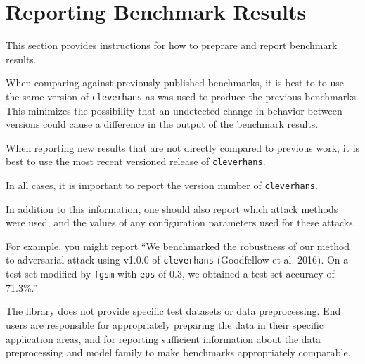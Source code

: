 \section{Reporting Benchmark Results}
\label{sec:benchmark}

This section provides instructions for how to preprare and report benchmark
results.

When comparing against previously published benchmarks, it is best to to use the
same version of \texttt{cleverhans} as was used to produce the previous
benchmarks. This minimizes the possibility that an undetected change in behavior
between versions could cause a difference in the output of the benchmark
results.

When reporting new results that are not directly compared to previous work, it
is best to use the most recent versioned release of \texttt{cleverhans}.

In all cases, it is important to report the version number of
\texttt{cleverhans}.

In addition to this information, one should also report which attack methods
were used, and the values of any configuration parameters used for these
attacks.

For example, you might report ``We benchmarked the robustness of our method to
adversarial attack using v1.0.0 of \texttt{cleverhans} (Goodfellow et al. 2016).
On a test set modified by \texttt{fgsm} with \texttt{eps} of 0.3, we obtained a
test set accuracy of 71.3\%.''

The library does not provide specific test datasets or data preprocessing. End
users are responsible for appropriately preparing the data in their specific
application areas, and for reporting sufficient information about the data
preprocessing and model family to make benchmarks appropriately comparable.
